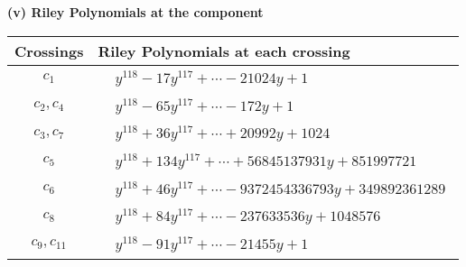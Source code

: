\documentclass[1p]{elsarticle_modified}
\theoremstyle{definition}
\begin{document}
\newpage\renewcommand{\arraystretch}{1}
\flushleft \textbf{(v) Riley Polynomials at the component}\newline \\
\begin{tabular}{m{50pt}|m{274pt}}
Crossings & \hspace{64pt}Riley Polynomials at each crossing \\
\hline $$\begin{aligned}c_{1}\end{aligned}$$&$\begin{aligned}
&y^{118}-17 y^{117}+\cdots-21024 y+1
\end{aligned}$\\
\hline $$\begin{aligned}c_{2},c_{4}\end{aligned}$$&$\begin{aligned}
&y^{118}-65 y^{117}+\cdots-172 y+1
\end{aligned}$\\
\hline $$\begin{aligned}c_{3},c_{7}\end{aligned}$$&$\begin{aligned}
&y^{118}+36 y^{117}+\cdots+20992 y+1024
\end{aligned}$\\
\hline $$\begin{aligned}c_{5}\end{aligned}$$&$\begin{aligned}
&y^{118}+134 y^{117}+\cdots+56845137931 y+851997721
\end{aligned}$\\
\hline $$\begin{aligned}c_{6}\end{aligned}$$&$\begin{aligned}
&y^{118}+46 y^{117}+\cdots-9372454336793 y+349892361289
\end{aligned}$\\
\hline $$\begin{aligned}c_{8}\end{aligned}$$&$\begin{aligned}
&y^{118}+84 y^{117}+\cdots-237633536 y+1048576
\end{aligned}$\\
\hline $$\begin{aligned}c_{9},c_{11}\end{aligned}$$&$\begin{aligned}
&y^{118}-91 y^{117}+\cdots-21455 y+1
\end{aligned}$\\

\end{tabular}
\end{document}
